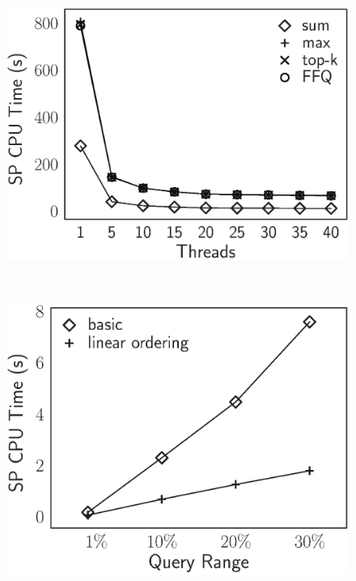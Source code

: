 \begin{figure}[t]
  \begin{minipage}[t]{0.5\linewidth}
    \centering
    \includegraphics[height=\ht\figbox]{exp-figs/aggregate-queries/threads.eps}
    \label{fig:aggregate-queries:mt}
  \end{minipage}~%
  \begin{minipage}[t]{0.5\linewidth}
    \centering
    \includegraphics[height=\ht\figbox]{exp-figs/aggregate-queries/linear.eps}
    \label{fig:aggregate-queries:linear}
  \end{minipage}
\end{figure}

